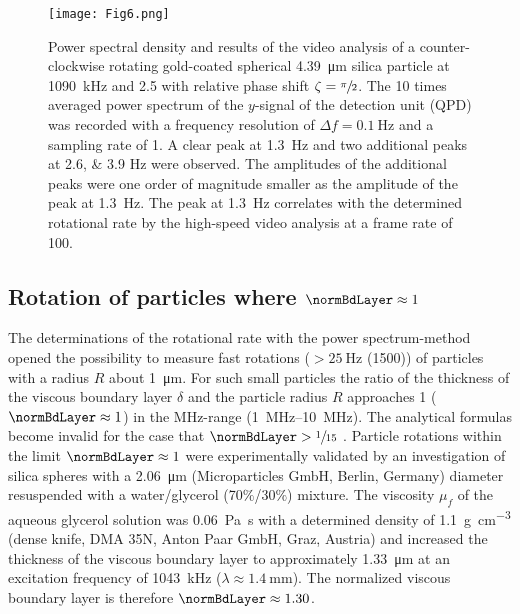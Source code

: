 \begin{figure}
    \centering
    \texttt{[image: Fig6.png]}
    \caption{Power spectral density and results of the video analysis of a 
      counter-clockwise rotating gold-coated spherical \SI{4.39}{\micro\meter} 
      silica particle at \SI{1090}{\kilo\hertz} and \SI{2.5}{\Vrms} with 
      relative phase shift $\zeta= \sfrac{\pi}{2}$. The 10 times averaged power 
      spectrum of the $y$-signal of the detection unit (QPD) was recorded with a 
      frequency resolution of $\Delta f=\SI{0.1}{\hertz}$ and a sampling rate of 
      \SI{1}{\MS}. A clear peak at \SI{1.3}{\hertz} and two additional peaks at 
      \numlist{2.6; 3.9} \si{\hertz} were observed. The amplitudes of the 
      additional peaks were one order of magnitude smaller as the amplitude of 
      the peak at \SI{1.3}{\hertz}. The peak at \SI{1.3}{\hertz} correlates with 
  the determined rotational rate by the high-speed video analysis at a frame 
  rate of \SI{100}{\fps}.\label{fig:Fig6}}
\end{figure}%

\subsection{Rotation of particles where $\normBdLayer \approx 
1$\label{sec:rotationParticles}}

The determinations of the rotational rate with the power spectrum-method opened 
the possibility to measure fast rotations ($>\SI{25}{\hertz}$ (\SI{1500}{\rpm})) 
of particles with a radius $R$ about \SI{1}{\micro\meter}.  For such small 
particles the ratio of the thickness of the viscous boundary layer $\delta$ and 
the particle radius $R$ approaches 1 ($\normBdLayer \approx 1$) in the 
\si{\mega\hertz}-range (\SIrange{1}{10}{\mega\hertz}). The analytical formulas 
become invalid for the case that $\normBdLayer > \sfrac{1}{15}$ \cite{hahn2016}.  
Particle rotations within the limit $\normBdLayer \approx 1$ were experimentally 
validated by an investigation of silica spheres with a \SI{2.06}{\micro\meter} 
(Microparticles GmbH, Berlin, Germany) diameter resuspended with a 
water/glycerol (70$\%$/30$\%$) mixture.  The viscosity $\mu_f$ of the aqueous 
glycerol solution was \SI{0.06}{\pascal\second} \cite{jerome1968} with a 
determined density of \SI{1.1}{\gram\per\centi\meter\cubed} (dense knife, DMA 
35N, Anton Paar GmbH, Graz, Austria) and increased the thickness of the viscous 
boundary layer to approximately \SI{1.33}{\micro\meter} at an excitation 
frequency of \SI{1043}{\kilo\hertz} ($\lambda \approx \SI{1.4}{\mm}$). The 
normalized viscous boundary layer is therefore $\normBdLayer \approx 1.30$.

